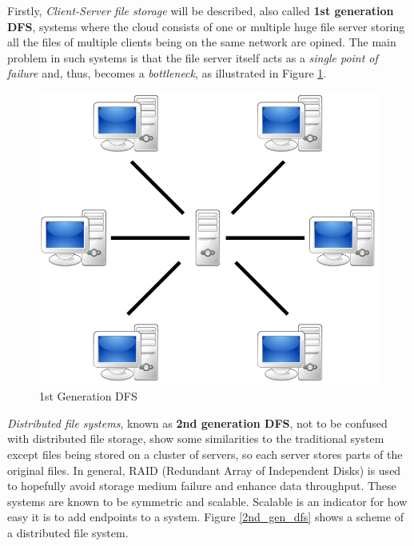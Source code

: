 Firstly, \textit{Client-Server file storage} will be described, also called \textbf{1st generation DFS}, systems where the cloud consists of one or multiple huge file server storing all the files of multiple clients being on the same network are opined. The main problem in such systems is that the file server itself acts as a \textit{single point of failure} and, thus, becomes a \textit{bottleneck}, as illustrated in Figure \ref{1st_gen_dfs}.
	\begin{figure}[H]
		\begin{center}
		\includegraphics[scale=0.25]{Talk5/1st_gen_dfs.PNG}
		\end{center}
		\caption{1st Generation DFS \cite{wikimedia:p2p}}
		\label{1st_gen_dfs}
	\end{figure}
\textit{Distributed file systems}, known as \textbf{2nd generation DFS}, not to be confused with distributed file storage, show some similarities to the traditional system except files being stored on a cluster of servers, so each server stores parts of the original files. In general, RAID (Redundant Array of Independent Disks) is used to hopefully avoid storage medium failure and enhance data throughput. These systems are known to be symmetric and scalable. Scalable is an indicator for how easy it is to add endpoints to a system. Figure \ref{2nd_gen_dfs} shows a scheme of a distributed file system.
